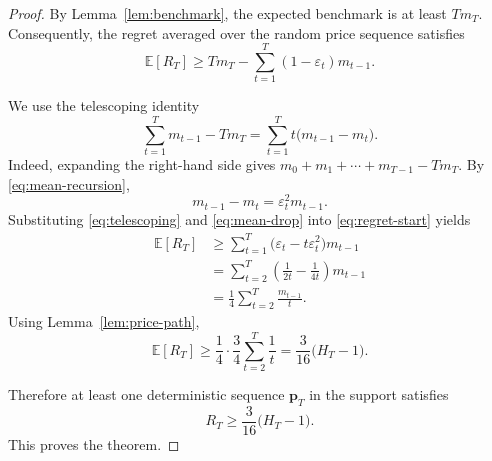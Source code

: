 \documentclass[11pt]{article}
\theoremstyle{remark}
\newcommand{\E}{\mathbb{E}}
\newcommand{\bp}{\boldsymbol{p}}
\begin{document}
\begin{proof}
By Lemma~\ref{lem:benchmark}, the expected benchmark is at least $Tm_T$.
Consequently, the regret averaged over the random price sequence satisfies
\[
\E[R_T]
\ge
Tm_T-
\sum_{t=1}^T(1-\varepsilon_t)m_{t-1}.
\tag{6}
\label{eq:regret-start}
\]

We use the telescoping identity
\[
\sum_{t=1}^T m_{t-1}-Tm_T
=
\sum_{t=1}^T t\bigl(m_{t-1}-m_t\bigr).
\tag{7}
\label{eq:telescoping}
\]
Indeed, expanding the right-hand side gives
$m_0+m_1+\cdots+m_{T-1}-Tm_T$.
By \eqref{eq:mean-recursion},
\[
m_{t-1}-m_t
=
\varepsilon_t^2m_{t-1}.
\tag{8}
\label{eq:mean-drop}
\]
Substituting \eqref{eq:telescoping} and \eqref{eq:mean-drop} into
\eqref{eq:regret-start} yields
\[
\begin{aligned}
\E[R_T]
&\ge
\sum_{t=1}^T
\bigl(\varepsilon_t-t\varepsilon_t^2\bigr)m_{t-1}\\
&=
\sum_{t=2}^T
\left(\frac{1}{2t}-\frac{1}{4t}\right)m_{t-1}\\
&=
\frac14\sum_{t=2}^T\frac{m_{t-1}}{t}.
\end{aligned}
\tag{9}
\label{eq:harmonic-sum}
\]
Using Lemma~\ref{lem:price-path},
\[
\E[R_T]
\ge
\frac14\cdot\frac34\sum_{t=2}^T\frac1t
=
\frac{3}{16}\bigl(H_T-1\bigr).
\tag{10}
\label{eq:average-lower-bound}
\]

Therefore at least one deterministic sequence
$\bp_T$ in the support satisfies
\[
R_T
\ge
\frac{3}{16}\bigl(H_T-1\bigr).
\]
This proves the theorem.
\end{proof}
\end{document}
